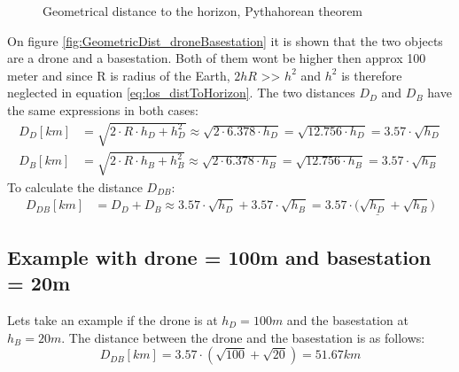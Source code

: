 \begin{figure}%
    \centering
    \qquad
    \caption{Geometrical distance to the horizon, Pythahorean theorem}%
    \label{fig:GeometricDistanceToHorizon}%
\end{figure}

On figure \ref{fig:GeometricDist_droneBasestation} it is shown that the two objects are a drone and a basestation. Both of them wont be higher then approx 100 meter and since R is radius of the Earth, $2hR$ >> $h^2$ and $h^2$ is therefore neglected in equation \ref{eq:los_distToHorizon}. The two distances $D_D$ and $D_B$ have the same expressions in both cases:
\begin{align*}
D_D [km] &= \sqrt{2\cdot R \cdot h_D + h_{D}^2} \approx \sqrt{2\cdot 6.378\cdot h_D} = \sqrt{12.756\cdot h_D} = 3.57\cdot \sqrt{h_D} \\
D_B [km] &= \sqrt{2\cdot R \cdot h_B + h_{B}^2} \approx \sqrt{2\cdot 6.378\cdot h_B} = \sqrt{12.756\cdot h_B} = 3.57\cdot \sqrt{h_B}
\end{align*}
To calculate the distance $D_{DB}$:
\begin{align}
D_{DB}[km] &= D_D + D_B \approx 3.57\cdot \sqrt{h_D} + 3.57\cdot \sqrt{h_B} = \underline{3.57\cdot (\sqrt{h_D} + \sqrt{h_B}} )
\end{align}

\subsection{Example with drone = 100m and basestation = 20m}
Lets take an example if the drone is at $h_D = 100m$ and the basestation at $h_B = 20m$. The distance between the drone and the basestation is as follows:
\begin{equation*}
D_{DB}[km] = 3.57\cdot (\sqrt{100} + \sqrt{20}) = 51.67km
\end{equation*}
